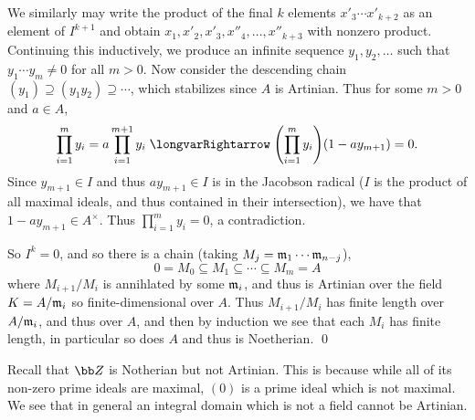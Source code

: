     We similarly may write the product of the final $k$ elements $x'_3\cdots x'_{k+2}$ as an element of $I^{k+1}$ and obtain $x_1,x'_2,x'_3,x''_4,\dots,x''_{k+3}$ with nonzero product.
    Continuing this inductively, we produce an infinite sequence $y_1,y_2,\dots$ such that $y_1\cdots y_m\neq0$ for all $m>0$.
    Now consider the descending chain $(y_1)\supseteq(y_1y_2)\supseteq\cdots$, which stabilizes since $A$ is Artinian.
    Thus for some $m>0$ and $a\in A$,
    $$ \prod_{i=1}^my_i = a\prod_{i=1}^{m+1}y_i \implies \parens{\prod_{i=1}^my_i}(1-ay_{m+1}) = 0 . $$
    Since $y_{m+1}\in I$ and thus $ay_{m+1}\in I$ is in the Jacobson radical ($I$ is the product of all maximal ideals, and thus contained in their intersection), we have that $1-ay_{m+1}\in A^\times$.
    Thus $\prod_{i=1}^my_i=0$, a contradiction.

    So $I^k=0$, and so there is a chain (taking $M_j={{\frak m}}_1\cdots{{\frak m}}_{n-j}$),
    $$ 0 = M_0 \subseteq M_1 \subseteq \cdots \subseteq M_m = A $$
    where $M_{i+1}/M_i$ is annihlated by some ${{\frak m}}_i$, and thus is Artinian over the field $K=A/{{\frak m}}_i$ so finite-dimensional over $A$.
    Thus $M_{i+1}/M_i$ has finite length over $A/{{\frak m}}_i$, and thus over $A$, and then by induction we see that each $M_i$ has finite length, in particular so does $A$ and thus is Noetherian.
    \qed

\eproof

\bnote

    Recall that $\bZ$ is Notherian but not Artinian.
    This is because while all of its non-zero prime ideals are maximal, $(0)$ is a prime ideal which is not maximal.
    We see that in general an integral domain which is not a field cannot be Artinian.

\enote


